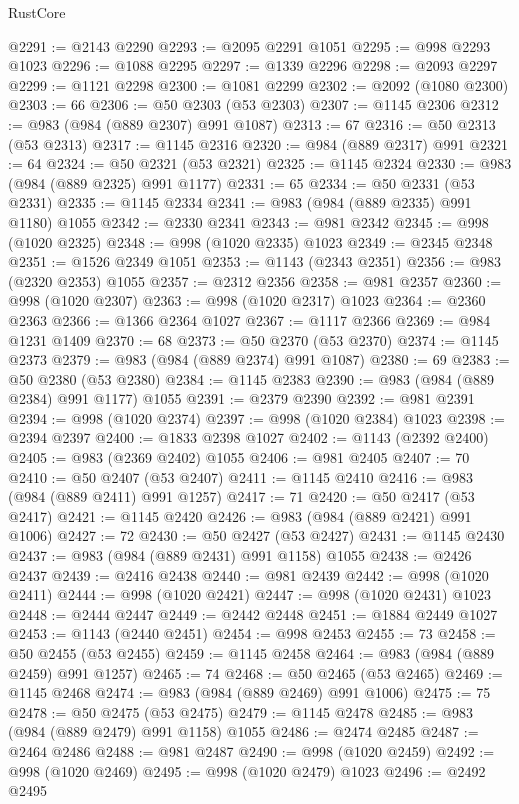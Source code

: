 \begin{lexlean}{RustCore}
\begin{coremodule}
@2291 := @2143 @2290
@2293 := @2095 @2291 @1051
@2295 := @998 @2293 @1023
@2296 := @1088 @2295
@2297 := @1339 @2296
@2298 := @2093 @2297
@2299 := @1121 @2298
@2300 := @1081 @2299
@2302 := @2092 (@1080 @2300)
@2303 := 66
@2306 := @50 @2303 (@53 @2303)
@2307 := @1145 @2306
@2312 := @983 (@984 (@889 @2307) @991 @1087)
@2313 := 67
@2316 := @50 @2313 (@53 @2313)
@2317 := @1145 @2316
@2320 := @984 (@889 @2317) @991
@2321 := 64
@2324 := @50 @2321 (@53 @2321)
@2325 := @1145 @2324
@2330 := @983 (@984 (@889 @2325) @991 @1177)
@2331 := 65
@2334 := @50 @2331 (@53 @2331)
@2335 := @1145 @2334
@2341 := @983 (@984 (@889 @2335) @991 @1180) @1055
@2342 := @2330 @2341
@2343 := @981 @2342
@2345 := @998 (@1020 @2325)
@2348 := @998 (@1020 @2335) @1023
@2349 := @2345 @2348
@2351 := @1526 @2349 @1051
@2353 := @1143 (@2343 @2351)
@2356 := @983 (@2320 @2353) @1055
@2357 := @2312 @2356
@2358 := @981 @2357
@2360 := @998 (@1020 @2307)
@2363 := @998 (@1020 @2317) @1023
@2364 := @2360 @2363
@2366 := @1366 @2364 @1027
@2367 := @1117 @2366
@2369 := @984 @1231 @1409
@2370 := 68
@2373 := @50 @2370 (@53 @2370)
@2374 := @1145 @2373
@2379 := @983 (@984 (@889 @2374) @991 @1087)
@2380 := 69
@2383 := @50 @2380 (@53 @2380)
@2384 := @1145 @2383
@2390 := @983 (@984 (@889 @2384) @991 @1177) @1055
@2391 := @2379 @2390
@2392 := @981 @2391
@2394 := @998 (@1020 @2374)
@2397 := @998 (@1020 @2384) @1023
@2398 := @2394 @2397
@2400 := @1833 @2398 @1027
@2402 := @1143 (@2392 @2400)
@2405 := @983 (@2369 @2402) @1055
@2406 := @981 @2405
@2407 := 70
@2410 := @50 @2407 (@53 @2407)
@2411 := @1145 @2410
@2416 := @983 (@984 (@889 @2411) @991 @1257)
@2417 := 71
@2420 := @50 @2417 (@53 @2417)
@2421 := @1145 @2420
@2426 := @983 (@984 (@889 @2421) @991 @1006)
@2427 := 72
@2430 := @50 @2427 (@53 @2427)
@2431 := @1145 @2430
@2437 := @983 (@984 (@889 @2431) @991 @1158) @1055
@2438 := @2426 @2437
@2439 := @2416 @2438
@2440 := @981 @2439
@2442 := @998 (@1020 @2411)
@2444 := @998 (@1020 @2421)
@2447 := @998 (@1020 @2431) @1023
@2448 := @2444 @2447
@2449 := @2442 @2448
@2451 := @1884 @2449 @1027
@2453 := @1143 (@2440 @2451)
@2454 := @998 @2453
@2455 := 73
@2458 := @50 @2455 (@53 @2455)
@2459 := @1145 @2458
@2464 := @983 (@984 (@889 @2459) @991 @1257)
@2465 := 74
@2468 := @50 @2465 (@53 @2465)
@2469 := @1145 @2468
@2474 := @983 (@984 (@889 @2469) @991 @1006)
@2475 := 75
@2478 := @50 @2475 (@53 @2475)
@2479 := @1145 @2478
@2485 := @983 (@984 (@889 @2479) @991 @1158) @1055
@2486 := @2474 @2485
@2487 := @2464 @2486
@2488 := @981 @2487
@2490 := @998 (@1020 @2459)
@2492 := @998 (@1020 @2469)
@2495 := @998 (@1020 @2479) @1023
@2496 := @2492 @2495

\end{coremodule}
\end{lexlean}
